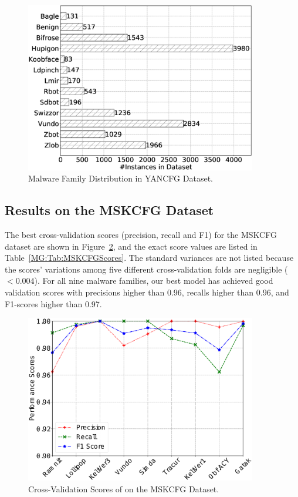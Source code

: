 \begin{figure}
    \centerline{\includegraphics[width=0.90\textwidth]{Magic/figures/YanAcfgLabelDist.eps}}
    \caption{Malware Family Distribution in YANCFG Dataset.}
    \label{MG:Fig:YANCFGLabelDist}
\end{figure}

\subsection{Results on the MSKCFG Dataset}
The best cross-validation scores (precision, recall and F1) for the MSKCFG dataset are shown in Figure~\ref{MG:Fig:MSKCFGScores}, and the exact score values are listed in Table~\ref{MG:Tab:MSKCFGScores}.
The standard variances are not listed because the scores' variations among five different cross-validation folds are negligible ($<0.004$).
For all nine malware families, our best model has achieved good validation scores with precisions higher than 0.96, recalls higher than 0.96, and F1-scores higher than 0.97.

\begin{figure}
    \centerline{\includegraphics[width=0.90\textwidth]{Magic/figures/MsAcfgScores.eps}}
    \caption{Cross-Validation Scores of \sysname on the MSKCFG Dataset.}
    \label{MG:Fig:MSKCFGScores}
\end{figure}

